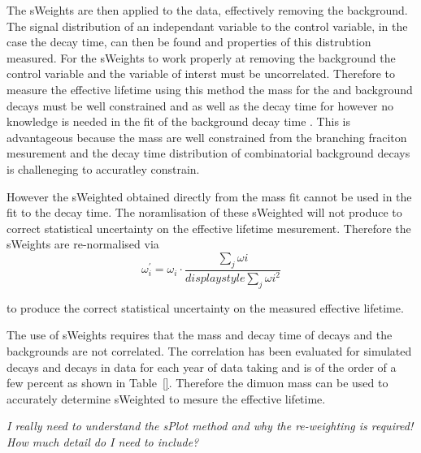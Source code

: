 The sWeights are then applied to the data, effectively removing the background. The signal distribution of an independant variable to the control variable, in the case the decay time, can then be found and properties of this distrubtion measured. For the sWeights to work properly at removing the background the control variable and the variable of interst must be uncorrelated. Therefore to measure the \bsmumu effective lifetime using this method the mass \pdfs for the \bsmumu and background decays must be well constrained and as well as the decay time \pdf for \bsmumu however no knowledge is needed in the fit of the background decay time \pdf. This is advantageous because the mass \pdfs are well constrained from the branching fraciton mesurement and the decay time distribution of combinatorial background decays is challeneging to accuratley constrain. 

However the sWeighted obtained directly from the mass fit cannot be used in the \ml fit to the decay time. The noramlisation of these sWeighted will not produce to correct statistical uncertainty on the effective lifetime mesurement. Therefore the sWeights are re-normalised via
\begin{equation}
\omega^{'}_{i}= \omega_{i} \cdot \frac{\displaystyle\sum_{j} \omega{i}}{displaystyle\sum_{j} \omega{i}^{2}}
\end{equation}

to produce the correct statistical uncertainty on the measured effective lifetime.

The use of sWeights requires that the mass and decay time of \bsmumu decays and the backgrounds are not correlated. The correlation has been evaluated for \bsmumu simulated decays and \bbbarmumux decays in data for each year of data taking and is of the order of a few percent as shown in Table~\ref{}. Therefore the dimuon mass can be used to accurately determine sWeighted to mesure the \bsmumu effective lifetime.


{\it I really need to understand the sPlot method and why the re-weighting is required! How much detail do I need to include?}

